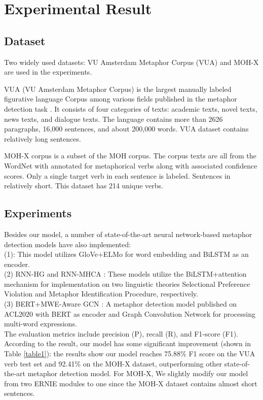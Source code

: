 \documentclass[11pt,a4paper]{article}
\begin{document}
\section{Experimental Result}
\subsection{Dataset}
Two widely used datasets: VU Amsterdam Metaphor Corpus (VUA) and MOH-X are used in the experiments.

VUA (VU Amsterdam Metaphor Corpus) is the largest manually labeled figurative language Corpus among various fields published in the metaphor detection task \cite{krennmayr2017vu}. It consists of four categories of texts: academic texts, novel texts, news texts, and dialogue texts. The language contains more than 2626 paragraphs, 16,000 sentences, and about 200,000 words. VUA dataset contains relatively long sentences.

MOH-X corpus \cite{mohammad2016metaphor} is a subset of the MOH corpus. The corpus texts are all from the WordNet with annotated for metaphorical verbs along with associated confidence scores. Only a single target verb in each sentence is labeled. Sentences in relatively short. This dataset has 214 unique verbs.

\subsection{Experiments}

Besides our model, a number of state-of-the-art neural network-based metaphor detection models have also implemented:\\
(1)\citet{gao2018neural}: This model utilizes GloVe+ELMo for word embedding and BiLSTM as an encoder.\\
(2) RNN-HG and RNN-MHCA \cite{mao2019end}: These models utilize the BiLSTM+attention mechanism for implementation on two linguistic theories Selectional Preference Violation and Metaphor Identification Procedure, respectively.\\
(3) BERT+MWE-Aware GCN \cite{rohanian-etal-2020-verbal}: A metaphor detection model published on ACL2020 with BERT as encoder and Graph Convolution Network for processing multi-word expressions. \\
The evaluation metrics include precision (P), recall (R), and F1-score (F1). According to the result, our model has some significant improvement (shown in Table \ref{table1}): the results show our model reaches 75.88\% F1 score on the VUA verb test set and 92.41\% on the MOH-X dataset, outperforming other state-of-the-art metaphor detection model. For MOH-X, We slightly modify our model from two ERNIE modules to one since the MOH-X dataset contains almost short sentences.
\\
\end{document}
